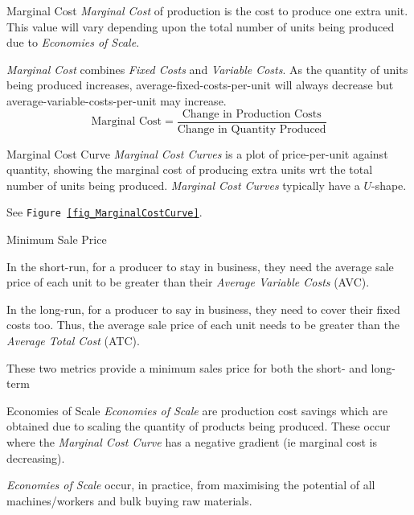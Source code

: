 \documentclass[11pt,a4paper]{article}
\begin{document}
  \begin{definition}{Marginal Cost}
    \textit{Marginal Cost} of production is the cost to produce one extra unit. This value will vary depending upon the total number of units being produced due to \textit{Economies of Scale}.
    \par \textit{Marginal Cost} combines \textit{Fixed Costs} and \textit{Variable Costs}. As the quantity of units being produced increases, average-fixed-costs-per-unit will always decrease but average-variable-costs-per-unit may increase.
    \[ \text{Marginal Cost}=\frac{\text{Change in Production Costs}}{\text{Change in Quantity Produced}} \]
  \end{definition}

  \begin{definition}{Marginal Cost Curve}
    \textit{Marginal Cost Curves} is a plot of price-per-unit against quantity, showing the marginal cost of producing extra units wrt the total number of units being produced. \textit{Marginal Cost Curves} typically have a $U$-shape.
    \par See \texttt{Figure \ref{fig_MarginalCostCurve}}.
  \end{definition}

  \begin{proposition}{Minimum Sale Price}
    \par In the short-run, for a producer to stay in business, they need the average sale price of each unit to be greater than their \textit{Average Variable Costs} (AVC).
    \par In the long-run, for a producer to say in business, they need to cover their fixed costs too. Thus, the average sale price of each unit needs to be greater than the \textit{Average Total Cost} (ATC).
    \par These two metrics provide a minimum sales price for both the short- and long-term
  \end{proposition}

  \begin{definition}{Economies of Scale}
    \textit{Economies of Scale} are production cost savings which are obtained due to scaling the quantity of products being produced. These occur where the \textit{Marginal Cost Curve} has a negative gradient (ie marginal cost is decreasing).
    \par \textit{Economies of Scale} occur, in practice, from maximising the potential of all machines/workers and bulk buying raw materials.
  \end{definition}
\end{document}
